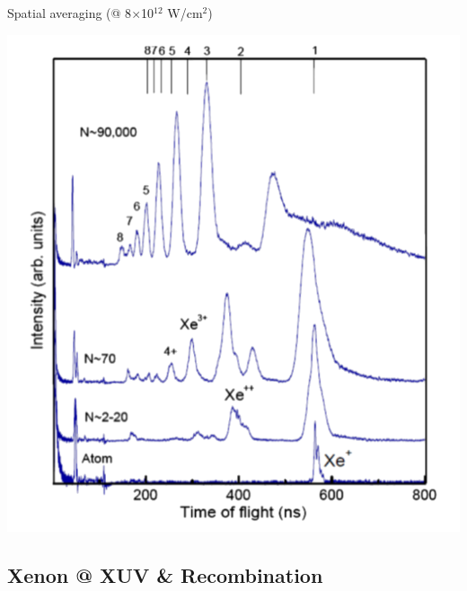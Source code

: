 \documentclass{beamer}
\begin{document}
\begin{frame}{Spatial averaging (@ 8$\times$10$^{12}$ W/cm$^2$)}
\begin{center}
{\begin{textblock}{0}
        \includegraphics[width=0.3\paperwidth]{figures/Bostedt2010_fig2_opaque}
        \end{textblock}
    }
    \end{center}
\end{frame}







\subsection{Xenon @ XUV \& Recombination}
\end{document}
